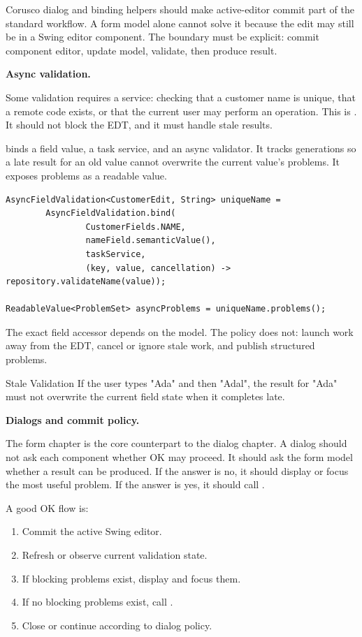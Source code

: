 Corusco dialog and binding helpers should make active-editor commit part of the
standard workflow. A form model alone cannot solve it because the edit may still
be in a Swing editor component. The boundary must be explicit: commit component
editor, update model, validate, then produce result.

\textbf{Async validation.}

Some validation requires a service: checking that a customer name is unique,
that a remote code exists, or that the current user may perform an operation.
This is . It should not block the EDT, and it
must handle stale results.

 binds a field value, a task service, and an async
validator. It tracks generations so a late result for an old value cannot
overwrite the current value's problems. It exposes problems as a readable value.

\begin{lstlisting}[caption={Conceptual async validation shape.}]
AsyncFieldValidation<CustomerEdit, String> uniqueName =
        AsyncFieldValidation.bind(
                CustomerFields.NAME,
                nameField.semanticValue(),
                taskService,
                (key, value, cancellation) -> repository.validateName(value));

ReadableValue<ProblemSet> asyncProblems = uniqueName.problems();
\end{lstlisting}

The exact field accessor depends on the model. The policy does not: launch work
away from the EDT, cancel or ignore stale work, and publish structured problems.

\begin{pitfallbox}{Stale Validation}
If the user types "Ada" and then "Adal", the result for "Ada" must not overwrite
the current field state when it completes late.
\end{pitfallbox}

\textbf{Dialogs and commit policy.}

The form chapter is the core counterpart to the dialog chapter. A dialog should
not ask each component whether OK may proceed. It should ask the form model
whether a result can be produced. If the answer is no, it should display or focus
the most useful problem. If the answer is yes, it should call .

A good OK flow is:

\begin{enumerate}
\item Commit the active Swing editor.
\item Refresh or observe current validation state.
\item If blocking problems exist, display and focus them.
\item If no blocking problems exist, call .
\item Close or continue according to dialog policy.
\end{enumerate}

